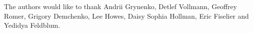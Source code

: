 
The authors would like to thank Andrii Grynenko, Detlef Vollmann, Geoffrey Romer,
Grigory Demchenko, Lee Howes, Daisy Sophia Hollman, Eric Fiselier and Yedidya Feldblum.
